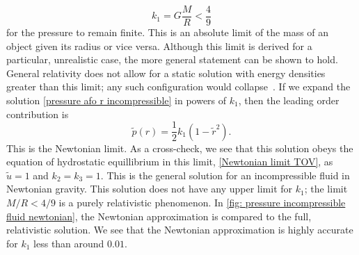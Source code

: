 %
\begin{equation}
    \label{mass-radius constraint}
    k_1 = G \frac{M}{R} < \frac{4}{9}
\end{equation}
%
for the pressure to remain finite.
This is an absolute limit of the mass of an object given its radius or vice versa.
Although this limit is derived for a particular, unrealistic case, the more general statement can be shown to hold.
General relativity does not allow for a static solution with energy densities greater than this limit; any such configuration would collapse~\autocite{carrollSpacetimeGeometryIntroduction2019}.
If we expand the solution \autoref{pressure afo r incompressible} in powers of $k_1$, then the leading order contribution is
%
\begin{equation}
    \tilde p(r) = \frac{1}{2} k_1 (1 - \tilde r^2).
\end{equation}
%
This is the Newtonian limit.
As a cross-check, we see that this solution obeys the equation of hydrostatic equillibrium in this limit, \autoref{Newtonian limit TOV}, as $\tilde u = 1$ and $k_2 = k_3 = 1$.
This is the general solution for an incompressible fluid in Newtonian gravity.
This solution does not have any upper limit for $k_1$; the limit $M/R < 4 / 9$ is a purely relativistic phenomenon.
In \autoref{fig: pressure incompressible fluid newtonian}, the Newtonian approximation is compared to the full, relativistic solution.
We see that the Newtonian approximation is highly accurate for $k_1$ less than around $0.01$.



